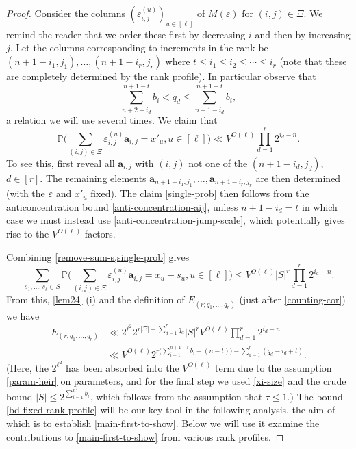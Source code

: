 \documentclass[11pt,reqno]{amsart}
\numberwithin{equation}{section}
\theoremstyle{definition}
\theoremstyle{remark}
\newcommand{\mb}{\mathbb}
\newcommand{\mbf}{\mathbf}
\newcommand{\eps}{\varepsilon}
\renewcommand{\le}{\leqslant}
\begin{document}
\begin{proof}
Consider the columns $(\eps_{i,j}^{(u)})_{u \in [\ell]}$ of $M(\eps)$ for $(i,j) \in \Xi$. We remind the reader that we order these first by decreasing $i$ and then by increasing $j$. Let the columns corresponding to increments in the rank be $(n +1 - i_1,j_1),\dots, (n +1 - i_r, j_r)$ where $t \le i_1 \le i_2 \le \cdots \le i_r$ (note that these are completely determined by the rank profile). In particular observe that 
\begin{equation}\label{qd-id}  \sum^{ n + 1 - t}_{n + 2- i_d }b_i < q_d \le \sum^{n + 1 - t}_{ n +1 -i_d} b_i,\end{equation} a relation we will use several times. We claim that 
\begin{equation}\label{single-prob} \mb{P} \Big(\sum_{(i,j) \in \Xi} \eps^{(u)}_{i,j} \mbf{a}_{i,j} = x'_u, u \in [\ell]\Big) \ll  V^{O(\ell)} \prod_{d = 1}^r 2^{i_d - n}.\end{equation}
To see this, first reveal all $\mbf{a}_{i,j}$ with $(i,j)$ not one of the $(n +1 -i_d, j_d)$, $d \in [r]$. The remaining elements $\mbf{a}_{n +1 -i_1,j_1},\dots, \mbf{a}_{n + 1 - i_r, j_r}$ are then determined (with the $\eps$ and $x'_u$ fixed). The claim \cref{single-prob} then follows from the anticoncentration bound \cref{anti-concentration-aij}, unless $n +1 - i_d = t$ in which case we must instead use \cref{anti-concentration-jump-scale}, which potentially gives rise to the $V^{O(\ell)}$ factors.

Combining \cref{remove-sum-s,single-prob} gives
\begin{equation}\label{1124-1126} \sum_{s_1,\dots, s_{\ell} \in S} \mb{P} \Big(\sum_{(i,j) \in \Xi} \eps^{(u)}_{i,j} \mbf{a}_{i,j} = x_u - s_u, u \in [\ell]\Big) \le V^{O(\ell)}|S|^r \prod_{d = 1}^r 2^{i_d - n}.  \end{equation}
From this, \cref{lem24} (i) and the definition of $E_{(r; q_1,\dots, q_r)}$ (just after \cref{counting-cor}) we have
\begin{align} \nonumber E_{(r; q_1,\dots, q_r)}  & \ll 2^{\ell^2} 2^{r|\Xi| - \sum_{d = 1}^r q_d}|S|^r V^{O(\ell)} \prod_{d = 1}^r 2^{i_d-n} \\ &  \ll V^{O(\ell)} 2^{r \big( \sum_{i=1}^{n + 1 - t} b_i - (n - t)\big) - \sum_{d = 1}^r (q_d - i_d + t)}.\label{bd-fixed-rank-profile} \end{align} 
(Here, the $2^{\ell^2}$ has been absorbed into the $V^{O(\ell)}$ term due to the assumption \cref{param-heir} on parameters, and for the final step we used \cref{xi-size} and the crude bound $|S| \le 2^{\sum_{i=1}^{n'} b_i}$, which follows from the assumption that $\tau \le 1$.) The bound \cref{bd-fixed-rank-profile} will be our key tool in the following analysis, the aim of which is to establish \cref{main-first-to-show}. Below we will use it examine the contributions to \cref{main-first-to-show} from various rank profiles. 


\end{proof}
\end{document}
